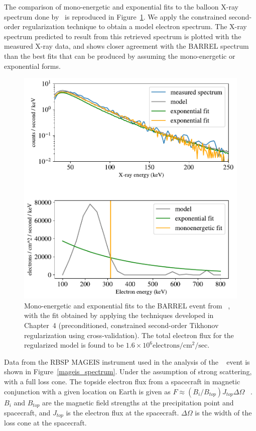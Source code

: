 The comparison of mono-energetic and exponential fits to the balloon X-ray spectrum done by~\cite{Halford2015} is reproduced in Figure~\ref{barrel_electron_fit_comparison}. We apply the constrained second-order regularization technique to obtain a model electron spectrum. The X-ray spectrum predicted to result from this retrieved spectrum is plotted with the measured X-ray data, and shows closer agreement with the BARREL spectrum than the best fits that can be produced by assuming the mono-energetic or exponential forms. 

\begin{figure}[p]
    \centering
    \includegraphics[width=1.0\textwidth]{figures/chapter_5/barrel_electron_fit_comparison/barrel_fit_comparison_2}
    \caption{Mono-energetic and exponential fits to the BARREL event from ~\cite{Halford2015}, with the fit obtained by applying the techniques developed in Chapter~4 (preconditioned, constrained second-order Tikhonov regularization using cross-validation). The total electron flux for the regularized model is found to be $1.6 \times 10^6 \mbox{electrons}/\mbox{cm}^2/\mbox{sec}$.}
    \label{barrel_electron_fit_comparison}
\end{figure}

Data from the RBSP MAGEIS instrument used in the analysis of the ~\cite{Halford2015} event is shown in Figure~\ref{mageis_spectrum}. Under the assumption of strong scattering, with a full loss cone. The topside electron flux from a spacecraft in magnetic conjunction with a given location on Earth is given as $F\approx (B_{i}/B_{top}) J_{top} \Delta \Omega$ ~\citep{kasahara2018}. $B_{i}$ and $B_{top}$ are the magnetic field strengths at the precipitation point and spacecraft, and $J_{top}$ is the electron flux at the spacecraft. $\Delta \Omega$ is the width of the loss cone at the spacecraft. 

